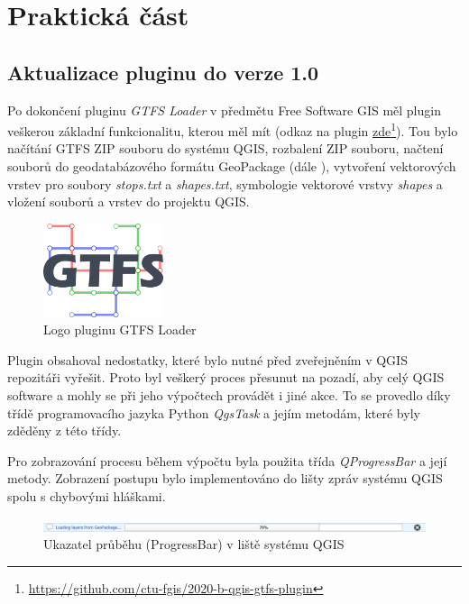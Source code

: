 \chapter{Praktická část}
\label{5-postup}

\section{Aktualizace pluginu do verze 1.0}
Po dokončení pluginu \textit{GTFS Loader} v předmětu Free Software GIS měl plugin veškerou základní
funkcionalitu, kterou měl mít (odkaz na plugin \href{https://github.com/ctu-fgis/2020-b-qgis-gtfs-plugin}
{\underline{zde}}\footnote{\url{https://github.com/ctu-fgis/2020-b-qgis-gtfs-plugin}}). 
Tou bylo načítání GTFS ZIP souboru do systému QGIS,
rozbalení ZIP souboru, načtení  souborů do geodatabázového formátu GeoPackage (dále ),
vytvoření vektorových vrstev pro soubory \textit{stops.txt} a \textit{shapes.txt},
symbologie vektorové vrstvy \textit{shapes} a vložení   souborů a vrstev do projektu QGIS.

\begin{figure}[H] \centering
    \includegraphics[width=100pt]{./pictures/logo-plugin.png}
    \caption[Logo pluginu GTFS Loader]{Logo pluginu GTFS Loader}
	\label{fig:logo-plugin}              
\end{figure}   


Plugin obsahoval nedostatky, které bylo nutné před zveřejněním v QGIS repo\-zitáři vyřešit. 
Proto byl veškerý proces přesunut na pozadí, aby celý QGIS software  a
mohly se při jeho výpočtech provádět i jiné akce. To se provedlo díky třídě programovacího jazyka Python \textit{QgsTask}
a jejím metodám, které byly zděděny z této třídy. \cite{QgsTask}

Pro zobrazování procesu během výpočtu byla použita třída \textit{QProgressBar} a její metody.
Zobrazení postupu bylo implementováno do lišty zpráv systému QGIS spolu s chybovými hláškami.

\begin{figure}[H] \centering
    \includegraphics[width=400pt]{./pictures/loading.png}
    \caption[Ukazatel průběhu (ProgressBar) v liště systému QGIS]{Ukazatel průběhu (ProgressBar) v liště systému QGIS}
	\label{fig:ProgressBar v liště systému QGIS}              
\end{figure}     

